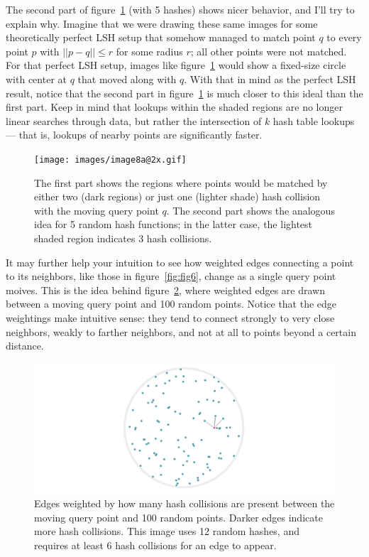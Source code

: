 \documentclass[20pt,]{extarticle}
\begin{document}
The second part of figure~\ref{fig:fig8a} (with 5 hashes) shows nicer
behavior, and I'll try to explain why. Imagine that we were drawing
these same images for some theoretically perfect LSH setup that somehow
managed to match point \(q\) to every point \(p\) with \(||p-q||\le r\)
for some radius \(r\); all other points were not matched. For that
perfect LSH setup, images like figure~\ref{fig:fig8a} would show a
fixed-size circle with center at \(q\) that moved along with \(q\). With
that in mind as the perfect LSH result, notice that the second part in
figure~\ref{fig:fig8a} is much closer to this ideal than the first part.
Keep in mind that lookups within the shaded regions are no longer linear
searches through data, but rather the intersection of \(k\) hash table
lookups --- that is, lookups of nearby points are significantly faster.

\begin{figure}
\centering
\texttt{[image: images/image8a@2x.gif]}
\caption{The first part shows the regions where points would be matched
by either two (dark regions) or just one (lighter shade) hash collision
with the moving query point \(q\). The second part shows the analogous
idea for 5 random hash functions; in the latter case, the lightest
shaded region indicates 3 hash collisions.}\label{fig:fig8a}
\end{figure}

It may further help your intuition to see how weighted edges connecting
a point to its neighbors, like those in figure~\ref{fig:fig6}, change as
a single query point moives. This is the idea behind
figure~\ref{fig:fig8b}, where weighted edges are drawn between a moving
query point and 100 random points. Notice that the edge weightings make
intuitive sense: they tend to connect strongly to very close neighbors,
weakly to farther neighbors, and not at all to points beyond a certain
distance.

\begin{figure}
\centering
\includegraphics{images/image8b@2x.gif}
\caption{Edges weighted by how many hash collisions are present between
the moving query point and 100 random points. Darker edges indicate more
hash collisions. This image uses 12 random hashes, and requires at least
6 hash collisions for an edge to appear.}\label{fig:fig8b}
\end{figure}
\end{document}

